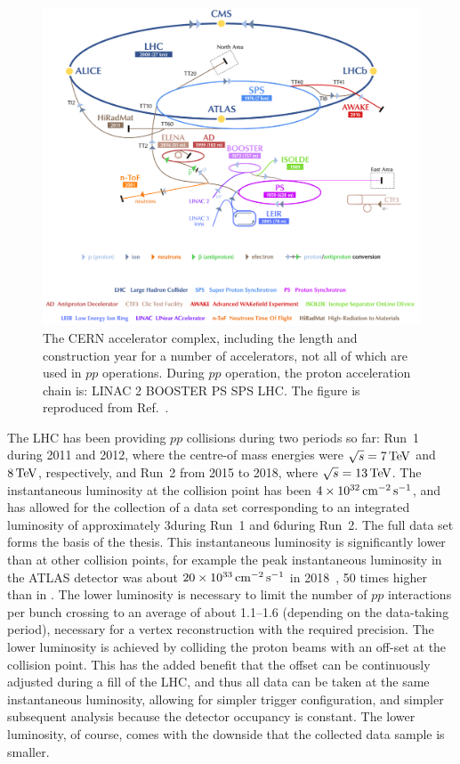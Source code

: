 \begin{figure}[tb]
    \centering
    \includegraphics[width=0.9\columnwidth]{figures/detector/CERN_complex.png}
    \caption{The CERN accelerator complex, including the length and construction year for a number of accelerators, not all of which are used in $pp$ operations. During $pp$ operation, the proton acceleration chain is: LINAC 2 \to BOOSTER \to PS \to SPS \to LHC.  The figure is reproduced from Ref.~\cite{CERNcomplex}.}
    \label{fig:CERN_accerators}
\end{figure}

The LHC has been providing $pp$ collisions during two periods so far: Run~1 during 2011 and 2012, where the centre-of mass energies were $\sqrt{s}=7\text{\,Te\kern -0.1em V}$ and $8\text{\,Te\kern -0.1em V}$, respectively, and Run~2 from 2015 to 2018, where $\sqrt{s}=13\text{\,Te\kern -0.1em V}$. The instantaneous luminosity at the \lhcb collision point has been $4\times 10^{32} \text{\,cm}^{-2} \,\mathrm s^{-1}$, and has allowed for the collection of a data set corresponding to an integrated luminosity of approximately 3\invfb during Run~1 and 6\invfb during Run~2. The full data set forms the basis of the thesis. This instantaneous luminosity is significantly lower than at other collision points, for example the peak instantaneous luminosity in the ATLAS detector was about $20\times 10^{33}\text{\,cm}^{-2}\,\mathrm s^{-1}$ in 2018~\cite{ATLAS-CONF-2019-021},  50 times higher than in \lhcb. The lower luminosity is necessary to limit the number of $pp$ interactions per bunch crossing to an average of about 1.1--1.6 (depending on the data-taking period), necessary for a vertex reconstruction with the required precision. The lower luminosity is achieved by colliding the proton beams with an off-set at the \lhcb collision point. This has the added benefit that the offset can be continuously adjusted during a fill of the LHC, and thus all data can be taken at the same instantaneous luminosity, allowing for simpler trigger configuration, and simpler subsequent analysis because the detector occupancy is constant. The lower luminosity, of course, comes with the downside that the collected data sample is smaller.

